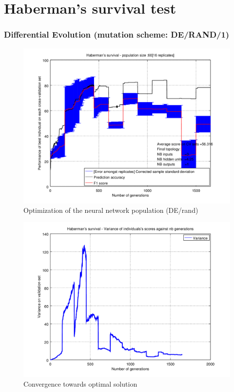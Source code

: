 \documentclass[a4paper,12pt, oneside]{memoir}
\begin{document}
\clearpage

\chapter{Haberman's survival test} \label{complementary-results-haberman}

\subsection{Differential Evolution (mutation scheme: DE/RAND/1)}

\begin{figure}[h]
  \centering
  \includegraphics[scale=0.65]{haberman-performancesVSepochs-DE}
  \vspace{-12pt}
  \caption{Optimization of the neural network population (DE/rand)}
  \label{haberman-perfs-DE-rand}
\end{figure}
\vspace{-10pt}

\begin{figure}[h]
  \centering
  \includegraphics[scale=0.65]{haberman-varianceVSepochs-DE}
  \vspace{-12pt}
  \caption{Convergence towards optimal solution}
  \label{haberman-variance-DE-rand}
\end{figure}
\vspace{-10pt}
\end{document}
